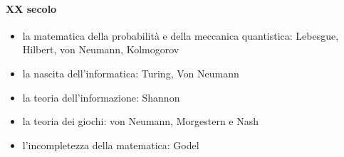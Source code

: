 \paragraph{XX secolo}
\begin{itemize}
  \item la matematica della probabilità e della meccanica quantistica: Lebesgue, Hilbert, von Neumann, Kolmogorov
  \item la nascita dell'informatica: Turing, Von Neumann
  \item la teoria dell'informazione: Shannon
  \item la teoria dei giochi: von Neumann, Morgestern e Nash
  \item l'incompletezza della matematica: Godel
\end{itemize}

